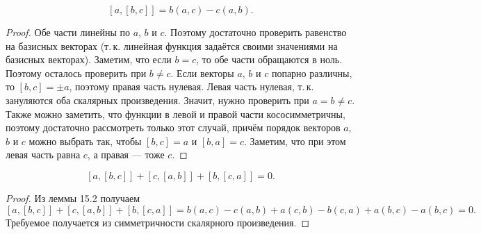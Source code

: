 \begin{lemma}
    $$
    [a, [b, c]] = b(a, c) - c(a, b).
    $$
\end{lemma}

\begin{proof}
    Обе части линейны по $a$, $b$ и $c$. Поэтому достаточно проверить равенство на базисных векторах (т.\,к. линейная функция задаётся своими значениями на базисных векторах). Заметим, что если $b = c$, то обе части обращаются в ноль. Поэтому осталось проверить при $b \ne c$. Если векторы $a$, $b$ и $c$ попарно различны, то $[b, c] = \pm a$, поэтому правая часть нулевая. Левая часть нулевая, т.\,к. зануляются оба скалярных произведения. Значит, нужно проверить при $a = b \ne c$. Также можно заметить, что функции в левой и правой части кососимметричны, поэтому достаточно рассмотреть только этот случай, причём порядок векторов $a$, $b$ и $c$ можно выбрать так, чтобы $[b, c] = a$ и $[b, a] = c$. Заметим, что при этом левая часть равна $c$, а правая --- тоже $c$. 
\end{proof}

\begin{theorem}
    $$
    [a, [b, c]] + [c, [a, b]] + [b, [c, a]] = 0.
    $$
\end{theorem}

\begin{proof}
    Из леммы 15.2 получаем
    $$
    [a, [b, c]] + [c, [a, b]] + [b, [c, a]] = b(a, c) - c(a, b) + a(c, b) - b(c, a) + a(b, c) - a(b, c) = 0.
    $$
    Требуемое получается из симметричности скалярного произведения.
\end{proof}


